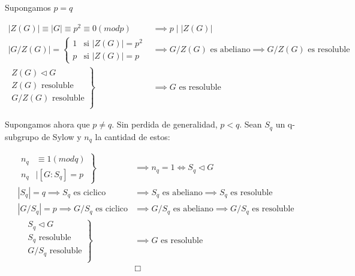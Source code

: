 \begin{solution} 
Supongamos $p=q$

\begin{align}
|Z(G)| \equiv |G| \equiv p^2 \equiv 0 (mod p) &\implies p \mid  |Z(G)|\\
|G/Z(G)| = 
  \begin{cases}
   1 & \text{si } |Z(G)|=p^2 \\
   p & \text{si } |Z(G)|=p
  \end{cases} &\implies \text{$G/Z(G)$ es abeliano} \implies \text{$G/Z(G)$ es resoluble}\\
 \left.\begin{aligned}
		Z(G) \triangleleft G\\
		\text{$Z(G)$ resoluble}\\
		\text{$G/Z(G)$ resoluble}\\
       \end{aligned}
 \right\}
 &\implies \text{$G$ es resoluble}
\end{align}

Supongamos ahora que $p \neq q$. Sin perdida de generalidad, $p < q$. Sean $S_q$ un q-subgrupo de Sylow y $n_q$ la cantidad de estos:

\begin{align}
 \left.\begin{aligned}
		n_q &\equiv 1 (mod q)\\
		n_q &\mid [G:S_q]=p
       \end{aligned}
 \right\}
 &\implies n_q = 1 \iff S_q \triangleleft G\\
|S_q| = q \implies \text{$S_q$ es ciclico} &\implies \text{$S_q$ es abeliano} \implies \text{$S_q$ es resoluble}\\
|G/S_q| = p \implies \text{$G/S_q$ es ciclico} &\implies \text{$G/S_q$ es abeliano} \implies \text{$G/S_q$ es resoluble}\\
 \left.\begin{aligned}
		&S_q \triangleleft G\\
		&\text{$S_q$ resoluble}\\
		&\text{$G/S_q$ resoluble}\\
       \end{aligned}
 \right\}
 &\implies \text{$G$ es resoluble}\\
 &\Box
\end{align}

\end{solution}